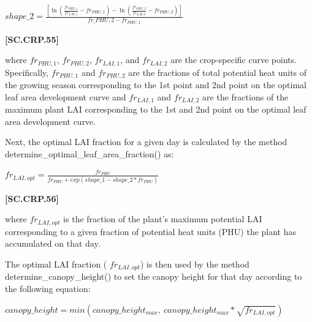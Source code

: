     \begin{center}
        \(shape\_2=\frac{[\ln(\frac{fr_{PHU,1}}{fr_{LAI,1}}-fr_{PHU,1})-\ln(\frac{fr_{PHU,2}}{fr_{LAI,2}}-fr_{PHU,2})]}{fr\_{PHU,2} - fr_{PHU,1}}\) 
    \end{center}
        \vspace{0.5cm}
    
            {\raggedleft \textbf{[SC.CRP.55]}\par}
            \vspace{0.5cm}


where \(fr_{PHU,1}\), \(fr_{PHU,2}\), \(fr_{LAI,1}\), and \(fr_{LAI,2}\) are the crop-specific curve points. Specifically, \(fr_{PHU,1}\) and \(fr_{PHU,2}\) are the fractions of total potential heat units of the growing season corresponding to the 1st point and 2nd point on the optimal leaf area development curve and \(fr_{LAI,1}\) and \(fr_{LAI,2}\) are the fractions of the maximum plant LAI corresponding to the 1st and 2nd point on the optimal leaf area development curve. 
 
Next, the optimal LAI fraction for a given day is calculated by the method determine\_optimal\_leaf\_area\_fraction() as:
   \vspace{0.2cm}

    \begin{center}
        \(fr_{LAI,opt}=\frac{fr_{PHU}}{fr_{PHU}+exp(shape\_1-shape\_2 * fr_{PHU})}\) 
    \end{center}
        \vspace{0.5cm}
    
            {\raggedleft \textbf{[SC.CRP.56]}\par}
            \vspace{0.5cm}


where \(fr_{LAI,opt}\) is the fraction of the plant’s maximum potential LAI corresponding to a given fraction of potential heat units (PHU) the plant has accumulated on that day.

The optimal LAI fraction ( \(fr_{LAI,opt}\)) is then used by the method determine\_canopy\_height() to set the canopy height for that day according to the following equation:
   \vspace{0.2cm}

    \begin{center}
        \(canopy\_height= min(canopy\_height_{max},\ canopy\_height_{max} * \sqrt{fr_{LAI,opt}})\) 
    \end{center}
        \vspace{0.5cm}
    
